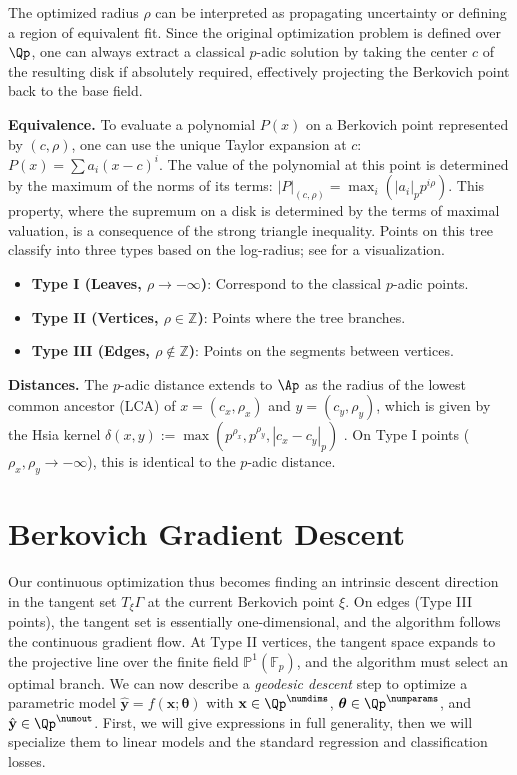 The optimized radius $\rho$ can be interpreted as propagating uncertainty or defining a region of equivalent fit. Since the original optimization problem is defined over $\Qp$, one can always extract a classical $p$-adic solution by taking the center $c$ of the resulting disk if absolutely required, effectively projecting the Berkovich point back to the base field.

\textbf{Equivalence.} To evaluate a polynomial $P(x)$ on a Berkovich point represented by $(c, \rho)$, one can use the unique Taylor expansion at $c$: $P(x) = \sum a_i(x - c)^i$. The value of the polynomial at this point is determined by the maximum of the norms of its terms: $|P|_{(c, \rho)} = \max_i (|a_i|_p p^{i \rho})$. This property, where the supremum on a disk is determined by the terms of maximal valuation, is a consequence of the strong triangle inequality. Points on this tree classify into three types based on the log-radius; see  for a visualization.
\begin{itemize}
    \item \textbf{Type I (Leaves, $\rho \to -\infty$)}: Correspond to the classical $p$-adic points.
    \item \textbf{Type II (Vertices, $\rho \in \mathbb{Z}$)}: Points where the tree branches. 
    \item \textbf{Type III (Edges, $\rho \notin \mathbb{Z}$)}: Points on the segments between vertices.
\end{itemize}


\textbf{Distances.} The $p$-adic distance extends to $\Ap$ as the radius of the lowest common ancestor (LCA) of $x = (c_x, \rho_x)$ and $y = (c_y, \rho_y)$, which is given by the Hsia kernel $\delta(x, y) := \max(p^{\rho_x}, p^{\rho_y}, |c_x - c_y|_p)$ \citep{baker2010potential}. On Type I points ($\rho_x, \rho_y \to -\infty$), this is identical to the $p$-adic distance.

\section{Berkovich Gradient Descent}
\label{sec:gradient_descent}

Our continuous optimization thus becomes finding an intrinsic descent direction in the tangent set $T_\xi\Gamma$ at the current Berkovich point $\xi$. On edges (Type III points), the tangent set is essentially one-dimensional, and the algorithm follows the continuous gradient flow. At Type II vertices, the tangent space expands to the projective line over the finite field $\mathbb{P}^1(\mathbb{F}_p)$, and the algorithm must select an optimal branch. We can now describe a \textit{geodesic descent} step to optimize a parametric model $\hat{\mathbf{y}} = f(\mathbf{x}; \boldsymbol{\theta})$ with $\mathbf{x} \in \Qp^\numdims$, $\boldsymbol{\theta} \in \Qp^\numparams$, and $\hat{\mathbf{y}} \in \Qp^\numout$. First, we will give expressions in full generality, then we will specialize them to linear models and the standard regression and classification losses.

